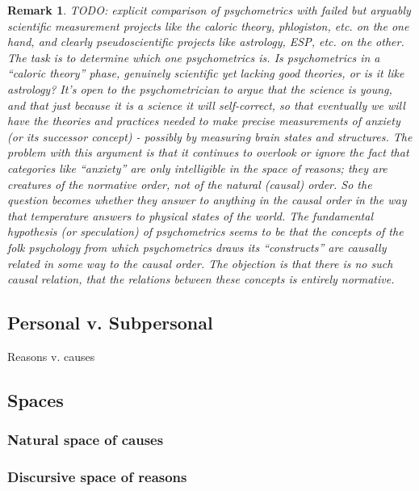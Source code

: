 \documentclass[11pt,twoside]{article}
\newtheorem{remark}{Remark}
\begin{document}
\begin{remark}
  TODO: explicit comparison of psychometrics with failed but arguably
  scientific measurement projects like the caloric theory, phlogiston,
  etc. on the one hand, and clearly pseudoscientific projects like
  astrology, ESP, etc. on the other.  The task is to determine which
  one psychometrics is.  Is psychometrics in a ``caloric theory''
  phase, genuinely scientific yet lacking good theories, or is it like
  astrology?  It's open to the psychometrician to argue that the
  science is young, and that just because it is a science it will
  self-correct, so that eventually we will have the theories and
  practices needed to make precise measurements of anxiety (or its
  successor concept) - possibly by measuring brain states and
  structures.  The problem with this argument is that it continues to
  overlook or ignore the fact that categories like ``anxiety'' are
  only intelligible in the space of reasons; they are creatures of the
  normative order, not of the natural (causal) order.  So the question
  becomes whether they answer to anything in the causal order in the
  way that temperature answers to physical states of the world.  The
  fundamental hypothesis (or speculation) of psychometrics seems to be
  that the concepts of the folk psychology from which psychometrics
  draws its ``constructs'' are causally related in some way to the
  causal order.  The objection is that there is no such causal
  relation, that the relations between these concepts is entirely
  normative.
\end{remark}

\subsection{Personal v. Subpersonal}

Reasons v. causes

\subsection{Spaces}

\subsubsection{Natural space of causes}

\subsubsection{Discursive space of reasons}
\end{document}
